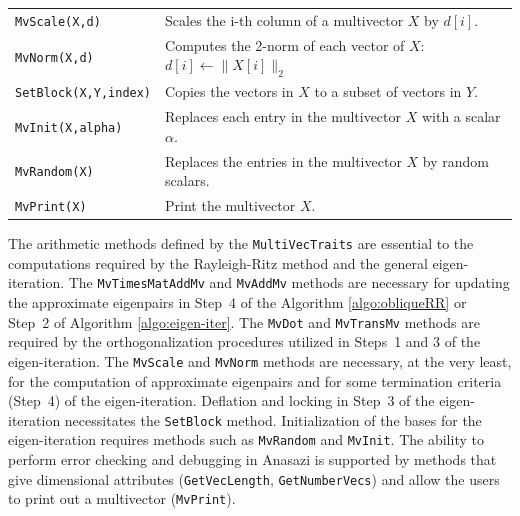 \documentclass[acmtoms]{acmtrans2m}
\newcommand{\aspace}[1]{\texttt{#1}}
\begin{document}
\begin{table}
\begin{center}
\begin{tabular}{| p{4cm} | p{8cm} |}
{\tt MvScale(X,d)}    & Scales the i-th column of a multivector $X$ by $d[i]$. \\

{\tt MvNorm(X,d)}     & Computes the 2-norm of each vector of
$X$: $d[i] \leftarrow \|X[i]\|_2$  \\\hline

{\tt SetBlock(X,Y,index)} & Copies the vectors in $X$ to a subset of vectors in
$Y$. \\

{\tt MvInit(X,alpha)} & Replaces each entry in the multivector $X$ with a scalar $\alpha$.  \\

{\tt MvRandom(X)} & Replaces the entries in the multivector $X$ by random
scalars. \\\hline

{\tt MvPrint(X)} & Print the multivector $X$. \\

\hline
\end{tabular}
\end{center}
\end{table}



The arithmetic methods defined by the \aspace{MultiVecTraits} are essential to the computations
required by the Rayleigh-Ritz method and the general eigen-iteration.  The 
\aspace{MvTimesMatAddMv} and \aspace{MvAddMv} methods are necessary for updating the approximate 
eigenpairs 
in Step~4 of the Algorithm \ref{algo:obliqueRR}
or Step~2 of Algorithm \ref{algo:eigen-iter}.
The \aspace{MvDot} and \aspace{MvTransMv} methods are required by the orthogonalization procedures
utilized in Steps~1 and 3 of the eigen-iteration.  The \aspace{MvScale} and \aspace{MvNorm}
methods are necessary, at the very least, for the computation of approximate eigenpairs and for  
some termination criteria (Step~4) of the eigen-iteration. 
Deflation and locking in Step~3 of the eigen-iteration necessitates the \aspace{SetBlock} method.
Initialization of the bases for the eigen-iteration requires
methods such as \aspace{MvRandom} and \aspace{MvInit}.
The ability to perform error checking and debugging in Anasazi is supported by methods that give 
dimensional attributes (\aspace{GetVecLength}, \aspace{GetNumberVecs}) and allow the users to print
out a multivector (\aspace{MvPrint}). 
\end{document}
